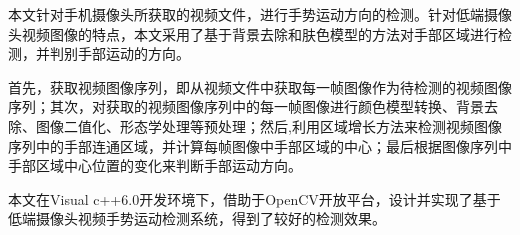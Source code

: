

本文针对手机摄像头所获取的视频文件，进行手势运动方向的检测。针对低端摄像头视频图像的特点，本文采用了基于背景去除和肤色模型的方法对手部区域进行检测，并判别手部运动的方向。

首先，获取视频图像序列，即从视频文件中获取每一帧图像作为待检测的视频图像序列；其次，对获取的视频图像序列中的每一帧图像进行颜色模型转换、背景去除、图像二值化、形态学处理等预处理；然后,利用区域增长方法来检测视频图像序列中的手部连通区域，并计算每帧图像中手部区域的中心；最后根据图像序列中手部区域中心位置的变化来判断手部运动方向。

本文在Visual c++6.0开发环境下，借助于OpenCV开放平台，设计并实现了基于低端摄像头视频手势运动检测系统，得到了较好的检测效果。

